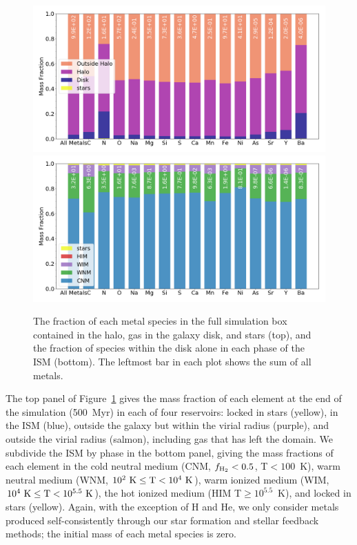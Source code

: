 \documentclass[twocolumn]{aastex61}
\begin{document}
\begin{figure}
\centering
\includegraphics[width=0.99\linewidth]{species_bar.png}\\
\includegraphics[width=0.99\linewidth]{species_bar_ISM.png}
\caption{The fraction of each metal species in the full simulation box contained in the halo, gas in the galaxy disk, and stars (top), and the fraction of species within the disk alone in each phase of the ISM (bottom). The leftmost bar in each plot shows the sum of all metals.}
\label{fig:species_fractions}
\end{figure}

The top panel of Figure~\ref{fig:species_fractions} gives the mass fraction of each element at the end of the simulation (500~Myr) in each of four reservoirs: locked in stars (yellow), in the ISM (blue), outside the galaxy but within the virial radius (purple), and outside the virial radius (salmon), including gas that has left the domain. We subdivide the ISM by phase in the bottom panel, giving the mass fractions of each element in the cold neutral medium (CNM, $f_{\rm H_2} < 0.5$,  T$< 100$~K), warm neutral medium (WNM, $10^2~\rm{K}\le \rm{T} < 10^4~\rm{K}$), warm ionized medium (WIM, $10^4~\rm{K}\le \rm{T} < 10^{5.5}~\rm{K}$), the hot ionized medium (HIM T$\ge 10^{5.5}$~K), and locked in stars (yellow). Again, with the exception of H and He, we only consider metals produced self-consistently through our star formation and stellar feedback methods; the initial mass of each metal species is zero.
\end{document}
